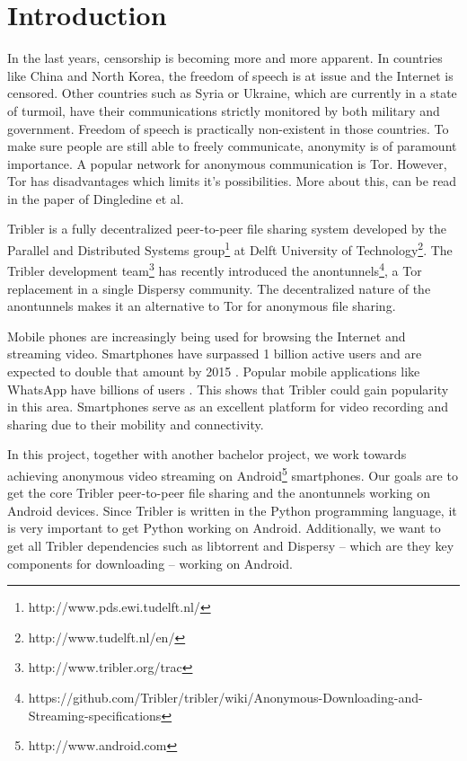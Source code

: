 
\chapter{Introduction}
In the last years, censorship is becoming more and more apparent. In countries like China and North Korea, the freedom of speech is at issue and the Internet is censored. Other countries such as Syria or Ukraine, which are currently in a state of turmoil, have their communications strictly monitored by both military and government. Freedom of speech is practically non-existent in those countries. To make sure people are still able to freely communicate, anonymity is of paramount importance. A popular network for anonymous communication is Tor. However, Tor has disadvantages which limits it's possibilities. More about this, can be read in the paper of Dingledine et al. \cite{dingledine2009performance}

Tribler is a fully decentralized peer-to-peer file sharing system developed by the Parallel and Distributed Systems group\footnote{http://www.pds.ewi.tudelft.nl/} at Delft University of Technology\footnote{http://www.tudelft.nl/en/}. The Tribler development team\footnote{http://www.tribler.org/trac} has recently introduced the anontunnels\footnote{https://github.com/Tribler/tribler/wiki/Anonymous-Downloading-and-Streaming-specifications}, a Tor replacement in a single Dispersy\cite{zeilemaker2013dispersy} community. The decentralized nature of the anontunnels makes it an alternative to Tor for anonymous file sharing.

Mobile phones are increasingly being used for browsing the Internet and streaming video. Smartphones have surpassed 1 billion active users and are expected to double that amount by 2015 \cite{yang2015smartphones}. Popular mobile applications like WhatsApp have billions of users \cite{googleplayinstagram, googleplaywhatsapp}. This shows that Tribler could gain popularity in this area. Smartphones serve as an excellent platform for video recording and sharing due to their mobility and connectivity.

In this project, together with another bachelor project, we work towards achieving anonymous video streaming on Android\footnote{http://www.android.com} smartphones. Our goals are to get the core Tribler peer-to-peer file sharing and the anontunnels working on Android devices. Since Tribler is written in the Python programming language, it is very important to get Python working on Android. Additionally, we want to get all Tribler dependencies such as libtorrent and Dispersy -- which are they key components for downloading -- working on Android.

